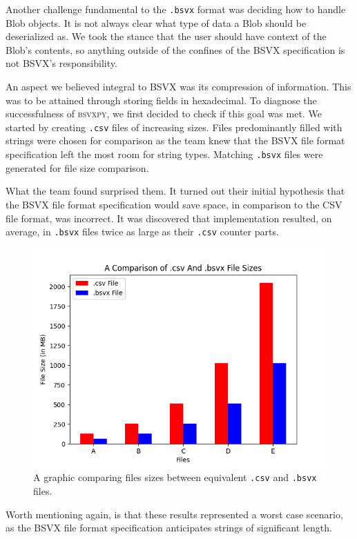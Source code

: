 \documentclass[10pt]{article}
\begin{document}
\indent{}
Another challenge fundamental to the \texttt{.bsvx} format was deciding how to handle Blob objects.
It is not always clear what type of data a Blob should be deserialized as.
We took the stance that the user should have context of the Blob's contents, so anything outside of the confines of the BSVX specification is not BSVX's responsibility.

\indent{}
An aspect we believed integral to BSVX was its compression of information.
This was to be attained through storing fields in hexadecimal.
To diagnose the successfulness of \textsc{bsvxpy}, we first decided to check if this goal was met.
We started by creating \texttt{.csv} files of increasing sizes.
Files predominantly filled with strings were chosen for comparison as the team knew that the BSVX file format specification left the most room for string types.
Matching \texttt{.bsvx} files were generated for file size comparison.

\indent{}
What the team found surprised them.
It turned out their initial hypothesis that the BSVX file format specification would save space, in comparison to the CSV file format, was incorrect.
It was discovered that implementation resulted, on average, in \texttt{.bsvx} files twice as large as their \texttt{.csv} counter parts.

\begin{figure}[H]
\centering
\includegraphics[width=5in]{scripts/figures/1.png}
\caption{A graphic comparing files sizes between equivalent \texttt{.csv} and \texttt{.bsvx} files.}
\label{fig:results_1}
\end{figure}

\indent{}
Worth mentioning again, is that these results represented a worst case scenario, as the BSVX file format specification anticipates strings of significant length.
\end{document}
